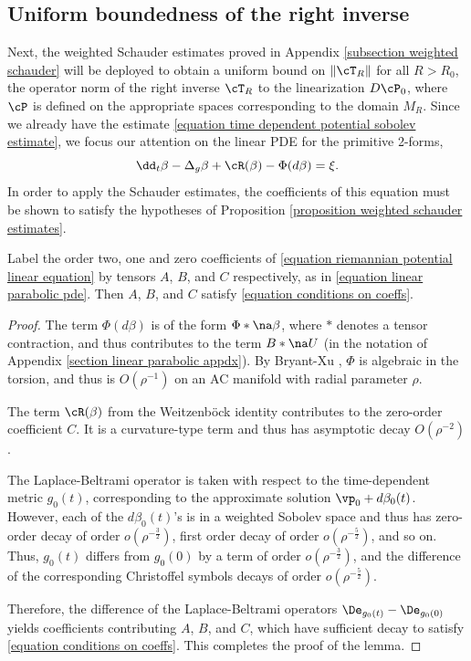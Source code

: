 \documentclass[hidelinks, 12pt, oneside, reqno]{amsart}
\begin{document}
\subsection{Uniform boundedness of the right inverse}\label{subsection uniform boundedness right inverse}

Next, the weighted Schauder estimates proved in Appendix \ref{subsection weighted schauder} will be deployed to obtain a uniform bound on $\|\cT_R\|$ for all $R > R_0$, the operator norm of the right inverse $\cT_R$ to the linearization $D\cP_0$, where $\cP$ is defined on the appropriate spaces corresponding to the domain $M_R$. Since we already have the estimate \eqref{equation time dependent potential sobolev estimate}, we focus our attention on the linear PDE for the primitive 2-forms, 
\begin{equation}\label{equation riemannian potential linear equation}
\dd_t \beta - \Delta_g \beta + \cR(\beta) - \Phi(d\beta) = \xi.
\end{equation}
In order to apply the Schauder estimates, the coefficients of this equation must be shown to satisfy the hypotheses of Proposition \ref{proposition weighted schauder estimates}.

\begin{lem}\label{lemma coefficients for weighted space}
    Label the order two, one and zero coefficients of \eqref{equation riemannian potential linear equation} by tensors $A$, $B$, and $C$ respectively, as in \eqref{equation linear parabolic pde}.  Then $A$, $B$, and $C$ satisfy \eqref{equation conditions on coeffs}.
\end{lem}

\begin{proof}
The term $\Phi(d\beta)$ is of the form $\Phi * \na \beta$, where $*$ denotes a tensor contraction, and thus contributes to the term $B * \na U$ (in the notation of Appendix \ref{section linear parabolic appdx}). By Bryant-Xu \cite{BryantXu}, $\Phi$ is algebraic in the torsion, and thus is $O(\rho^{-1})$ on an AC manifold with radial parameter $\rho$. 

The term $\cR(\beta)$ from the Weitzenb\"ock identity contributes to the zero-order coefficient $C$. It is a curvature-type term and thus has asymptotic decay $O(\rho^{-2})$.  

The Laplace-Beltrami operator is taken with respect to the time-dependent metric $g_0(t)$, corresponding to the approximate solution $\vp_0 + d\beta_0(t)$. However, each of the $d\beta_0(t)$'s is in a weighted Sobolev space and thus has zero-order decay of order $o(\rho^{-\frac32})$, first order decay of order $o(\rho^{-\frac52})$, and so on. Thus, $g_0(t)$ differs from $g_0(0)$ by a term of order $o(\rho^{-\frac32})$, and the difference of the corresponding Christoffel symbols decays of order $o(\rho^{-\frac52})$. 

Therefore, the difference of the Laplace-Beltrami operators $\De_{g_0(t)}-\De_{g_0(0)}$ yields coefficients contributing $A$, $B$, and $C$, which have sufficient decay to satisfy \eqref{equation conditions on coeffs}.  This completes the proof of the lemma.
\end{proof}
\end{document}
